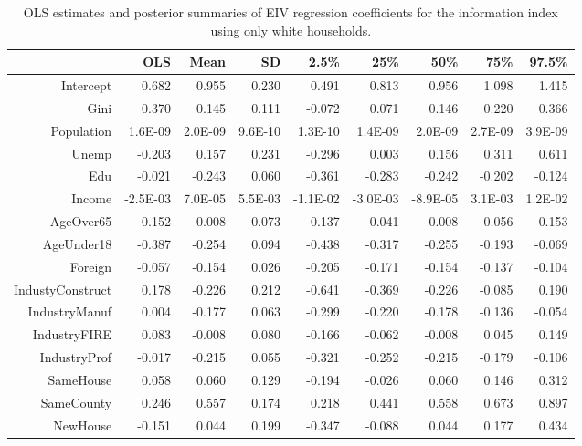 \documentclass[12pt]{article}
\begin{document}
\begin{table}[ht]
\centering
\begin{tabular}{rrrrrrrrr}
  \hline
 & OLS & Mean & SD & 2.5\% & 25\% & 50\% & 75\% & 97.5\% \\ 
  \hline
Intercept & 0.682 & 0.955 & 0.230 & 0.491 & 0.813 & 0.956 & 1.098 & 1.415 \\ 
  Gini & 0.370 & 0.145 & 0.111 & -0.072 & 0.071 & 0.146 & 0.220 & 0.366 \\ 
  Population & 1.6E-09 & 2.0E-09 & 9.6E-10 & 1.3E-10 & 1.4E-09 & 2.0E-09 & 2.7E-09 & 3.9E-09 \\ 
  Unemp & -0.203 & 0.157 & 0.231 & -0.296 & 0.003 & 0.156 & 0.311 & 0.611 \\ 
  Edu & -0.021 & -0.243 & 0.060 & -0.361 & -0.283 & -0.242 & -0.202 & -0.124 \\ 
  Income & -2.5E-03 & 7.0E-05 & 5.5E-03 & -1.1E-02 & -3.0E-03 & -8.9E-05 & 3.1E-03 & 1.2E-02 \\ 
  AgeOver65 & -0.152 & 0.008 & 0.073 & -0.137 & -0.041 & 0.008 & 0.056 & 0.153 \\ 
  AgeUnder18 & -0.387 & -0.254 & 0.094 & -0.438 & -0.317 & -0.255 & -0.193 & -0.069 \\ 
  Foreign & -0.057 & -0.154 & 0.026 & -0.205 & -0.171 & -0.154 & -0.137 & -0.104 \\ 
  IndustyConstruct & 0.178 & -0.226 & 0.212 & -0.641 & -0.369 & -0.226 & -0.085 & 0.190 \\ 
  IndustryManuf & 0.004 & -0.177 & 0.063 & -0.299 & -0.220 & -0.178 & -0.136 & -0.054 \\ 
  IndustryFIRE & 0.083 & -0.008 & 0.080 & -0.166 & -0.062 & -0.008 & 0.045 & 0.149 \\ 
  IndustryProf & -0.017 & -0.215 & 0.055 & -0.321 & -0.252 & -0.215 & -0.179 & -0.106 \\ 
  SameHouse & 0.058 & 0.060 & 0.129 & -0.194 & -0.026 & 0.060 & 0.146 & 0.312 \\ 
  SameCounty & 0.246 & 0.557 & 0.174 & 0.218 & 0.441 & 0.558 & 0.673 & 0.897 \\ 
  NewHouse & -0.151 & 0.044 & 0.199 & -0.347 & -0.088 & 0.044 & 0.177 & 0.434 \\ 
   \hline
\end{tabular}
\caption{OLS estimates and posterior summaries of EIV regression coefficients for the information index using only white households.}
\label{tab:eiv.hr.raw.white}
\end{table}
\end{document}
